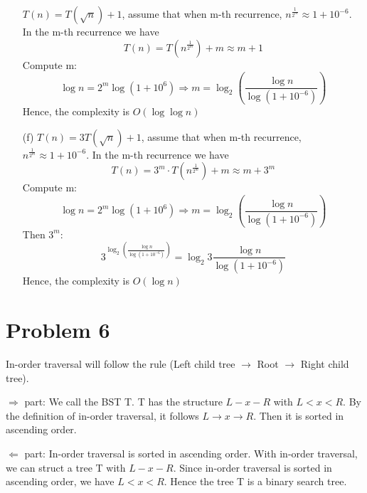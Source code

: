 \documentclass[12pt,a4paper]{article}
\begin{document}
\begin{enumerate}
        $T(n) = T(\sqrt{n}) + 1$, assume that when m-th recurrence, $n^{\frac{1}{2^m}}\approx 1 + 10^{-6}$. In the m-th recurrence we have 
        \[
            T(n) = T(n^{\frac{1}{2^m}}) + m \approx m + 1
        \]
        Compute m:
        \[
                \log n = 2^{m}\log(1 + 10^{6}) \Rightarrow m = \log_{2}(\frac{\log n}{\log(1+10^{-6})})
        \]
        Hence, the complexity is $O(\log\log n)$
    \item[(f)]
        $T(n) = 3T(\sqrt{n}) + 1$, assume that when m-th recurrence, $n^{\frac{1}{2^m}}\approx 1 + 10^{-6}$. In the m-th recurrence we have 
        \[
            T(n) = 3^m\cdot T(n^{\frac{1}{2^m}}) + m \approx m + 3^m
        \]
        Compute m:
        \[
                \log n = 2^{m}\log(1 + 10^{6}) \Rightarrow m = \log_{2}(\frac{\log n}{\log(1+10^{-6})})
        \]
        Then $3^m$:
        \[
                3^{\log_{2}(\frac{\log n}{\log(1+10^{-6})})} = \log_{2}3\frac{\log n}{\log(1+10^{-6})} 
        \]
        Hence, the complexity is $O(\log n)$
\end{enumerate}

\section{Problem 6}

In-order traversal will follow the rule (Left child tree $\rightarrow $ Root $\rightarrow $ Right child tree).

$\Rightarrow$ part: We call the BST T. T has the structure $L-x-R$ with $L < x < R$. By the definition of in-order traversal, it follows $L \rightarrow x \rightarrow R$.
Then it is sorted in ascending order.

$\Leftarrow$ part: In-order traversal is sorted in ascending order. With in-order traversal, we can struct a tree T with $L-x-R$.
Since in-order traversal is sorted in ascending order, we have $L < x < R$. Hence the tree T is a binary search tree.
\end{document}
